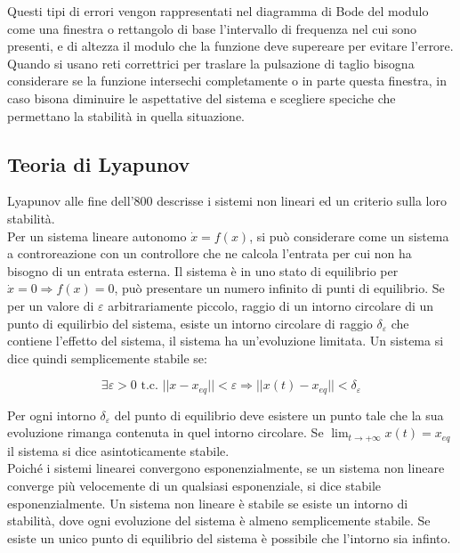 \documentclass{article}
\numberwithin{equation}{subsection}
\begin{document}
Questi tipi di errori vengon rappresentati nel diagramma di Bode del modulo come una finestra o rettangolo di base l'intervallo di frequenza nel cui sono presenti, e di 
altezza il modulo che la funzione deve supereare per evitare l'errore. Quando si usano reti correttrici per traslare la pulsazione di taglio bisogna considerare se la 
funzione intersechi completamente o in parte questa finestra, in caso bisona diminuire le aspettative del sistema e scegliere speciche che permettano la stabilità in quella 
situazione. 

\subsection{Teoria di Lyapunov}

Lyapunov alle fine dell'$800$ descrisse i sistemi non lineari ed un criterio sulla loro stabilità. \\

Per un sistema lineare autonomo $\dot x=f(x)$, si può considerare come un 
sistema a controreazione con un controllore che ne calcola l'entrata per cui non ha bisogno di un entrata esterna. Il sistema è in uno stato di equilibrio per 
$\dot x=0\Rightarrow f(x)=0$, può presentare un numero infinito di punti di equilibrio. Se per un valore di $\varepsilon$ arbitrariamente piccolo, raggio di un intorno 
circolare di un punto di equilirbio del sistema, esiste un intorno circolare di raggio $\delta_{\varepsilon}$ che contiene l'effetto del sistema, il sistema ha un'evoluzione 
limitata. Un sistema si dice quindi semplicemente stabile se:

\begin{equation}
    \exists\varepsilon>0\mbox{ t.c. }||x-x_{eq}||<\varepsilon\Rightarrow||x(t)-x_{eq}||<\delta_{\varepsilon}
\end{equation}

Per ogni intorno $\delta_{\varepsilon}$ del punto di equilibrio deve esistere un punto tale che la sua evoluzione rimanga contenuta in quel intorno circolare. 
Se $\lim_{t\to+\infty}x(t)=x_{eq}$ il sistema si dice asintoticamente stabile. \\

Poiché i sistemi linearei convergono esponenzialmente, se un sistema non lineare converge più velocemente di un qualsiasi esponenziale, si dice stabile esponenzialmente. 
Un sistema non lineare è stabile se esiste un intorno di stabilità, dove ogni evoluzione del sistema è almeno semplicemente stabile. Se esiste un unico punto di equilibrio del 
sistema è possibile che l'intorno sia infinto. \\
\end{document}
